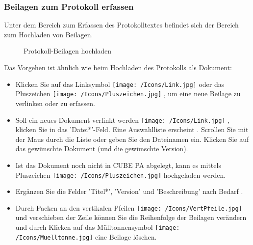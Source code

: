 \subsubsection{Beilagen zum Protokoll erfassen}

Unter dem Bereich zum Erfassen des Protokolltextes befindet sich der Bereich zum Hochladen von Beilagen.

\begin{figure}[H]
\caption{Protokoll-Beilagen hochladen}
\end{figure}

Das Vorgehen ist ähnlich wie beim Hochladen des Protokolls als Dokument:

\begin{itemize}
\item
Klicken Sie auf das Linksymbol \texttt{[image: /Icons/Link.jpg]} oder das Pluszeichen \texttt{[image: /Icons/Pluszeichen.jpg]} , um eine neue Beilage zu verlinken oder zu erfassen.
\item
Soll ein neues Dokument verlinkt werden \texttt{[image: /Icons/Link.jpg]} , klicken Sie in das 'Datei*'-Feld. Eine Auswahlliste erscheint . Scrollen Sie mit der Maus durch die Liste oder geben Sie den Dateinamen ein. Klicken Sie auf das gewünschte Dokument (und die gewünschte Version).
\item
Ist das Dokument noch nicht in CUBE PA abgelegt, kann es mittels Pluszeichen \texttt{[image: /Icons/Pluszeichen.jpg]}  hochgeladen werden.
\item
Ergänzen Sie die Felder 'Titel*', 'Version' und 'Beschreibung' nach Bedarf .
\item
Durch Packen an den vertikalen Pfeilen \texttt{[image: /Icons/VertPfeile.jpg]}  und verschieben der Zeile können Sie die Reihenfolge der Beilagen verändern und durch Klicken auf das Mülltonnensymbol \texttt{[image: /Icons/Muelltonne.jpg]}  eine Beilage löschen.
\end{itemize}

